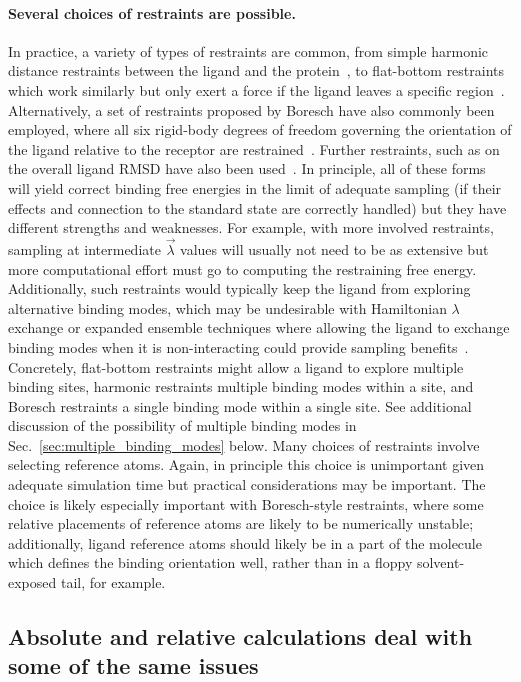 \documentclass[9pt,bestpractices]{livecoms}
\begin{document}
\paragraph{Several choices of restraints are possible.}
In practice, a variety of types of restraints are common, from simple harmonic distance restraints between the ligand and the protein~\cite{mobley2006use}, to flat-bottom restraints which work similarly but only exert a force if the ligand leaves a specific region~\cite{chen2007can}.
%
Alternatively, a set of restraints proposed by Boresch have also commonly been employed, where all six rigid-body degrees of freedom governing the orientation of the ligand relative to the receptor are restrained~\cite{boresch2003absolutea, leitgeb2005alchemicala}.
Further restraints, such as on the overall ligand RMSD have also been used~\cite{woo2005calculationa}.
%
In principle, all of these forms will yield correct binding free energies in the limit of adequate sampling (if their effects and connection to the standard state are correctly handled) but they have different strengths and weaknesses.
For example, with more involved restraints, sampling at intermediate $\vec{\lambda}$ values will usually not need to be as extensive but more computational effort must go to computing the restraining free energy.
Additionally, such restraints would typically keep the ligand from exploring alternative binding modes, which may be undesirable with Hamiltonian $\lambda$ exchange or expanded ensemble techniques where allowing the ligand to exchange binding modes when it is non-interacting could provide sampling benefits~\cite{wang2013identifying}.
Concretely, flat-bottom restraints might allow a ligand to explore multiple binding sites, harmonic restraints multiple binding modes within a site, and Boresch restraints a single binding mode within a single site.
See additional discussion of the possibility of multiple binding modes in Sec.~\ref{sec:multiple_binding_modes} below.
%
Many choices of restraints involve selecting reference atoms.
Again, in principle this choice is unimportant given adequate simulation time but practical considerations may be important.
The choice is likely especially important with Boresch-style restraints, where some relative placements of reference atoms are likely to be numerically unstable; additionally, ligand reference atoms should likely be in a part of the molecule which defines the binding orientation well, rather than in a floppy solvent-exposed tail, for example.

\subsection{Absolute and relative calculations deal with some of the same issues}
\end{document}
